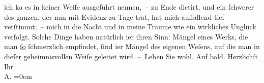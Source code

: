 \begin{ledgroupsized}[t]{13cm}
                    ich ka{\geminationn} es in keiner Weiſe ausgeführt nennen, – zu
                    Ende dictirt, und ein ſchwerer \label{K_L01252_1v}\label{K_L01252_1h} des
                    ganzen, der nun mit Evidenz zu Tage trat, hat mich auffallend tief verſtimmt; –
                    mich in die Nacht und in meine Träume wie ein wirkliches Unglück ver{\pb}folgt. Solche Dinge haben natürlich i{\geminationm}er ihren Sinn: Mängel eines Werks, die man \uline{ſo}{ }ſchmerzlich empfindet, ſind i{\geminationm}er Mängel des eigenen Weſens, auf die man in
                    dieſer geheimnisvollen Weiſe geleitet wird.\pend
           \pstart
           – Leben Sie wohl. Auf bald.\pend
           \pstart
           Herzlichſt Ihr{\\[\baselineskip]}\spacefill\mbox{A.}\pend
           \leftskip=0em{}
         
         \endnumbering{}\end{ledgroupsized}  \newcommand{\dateiname}{L01252}\newcommand{\titel}{Arthur Schnitzler an Hugo von Hofmannsthal, [25.? 11. 1902]}\newcommand{\editorInnen}{Martin Anton Müller und Gerd-Hermann Susen}
      